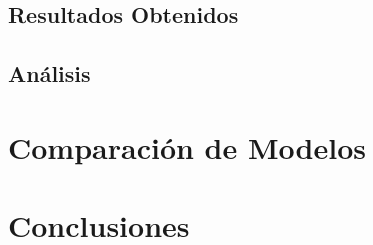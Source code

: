 \documentclass{uc3mpracticas}
\begin{document}
    \subsection{Resultados Obtenidos}

    \subsection{Análisis}

  \section{Comparación de Modelos}

  \section{Conclusiones}
\end{document}
